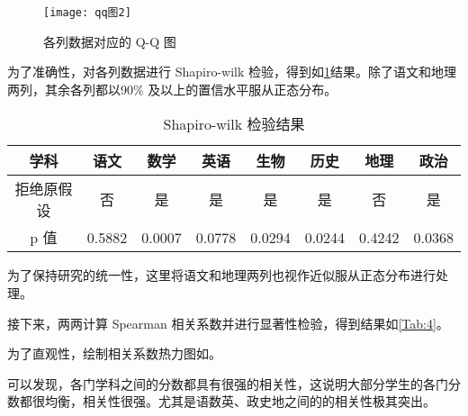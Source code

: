 \documentclass[withoutpreface]{cumcmthesis}
\begin{document}
\begin{figure}[H]
    \centering
    \texttt{[image: qq图2]}
    \caption{各列数据对应的 Q-Q 图}\label{Fig:6}
\end{figure}

为了准确性，对各列数据进行 Shapiro-wilk 检验，得到如\cref{Tab:3}结果。除了语文和地理两列，其余各列都以90\% 及以上的置信水平服从正态分布。

\begin{table}[H]
    \centering
    \caption{Shapiro-wilk 检验结果}\label{Tab:3}
    \begin{tabular}{|c|c|c|c|c|c|c|c|}
        \hline
        学科    & 语文     & 数学     & 英语     & 生物     & 历史     & 地理     & 政治     \\
        \hline
        拒绝原假设 & 否      & 是      & 是      & 是      & 是      & 否      & 是      \\
        \hline
        p 值   & 0.5882 & 0.0007 & 0.0778 & 0.0294 & 0.0244 & 0.4242 & 0.0368 \\
        \hline
    \end{tabular}
\end{table}

为了保持研究的统一性，这里将语文和地理两列也视作近似服从正态分布进行处理。

接下来，两两计算 Spearman 相关系数并进行显著性检验，得到结果如\cref{Tab:4}。

为了直观性，绘制相关系数热力图如。

可以发现，各门学科之间的分数都具有很强的相关性，这说明大部分学生的各门分数都很均衡，相关性很强。尤其是语数英、政史地之间的的相关性极其突出。
\end{document}
